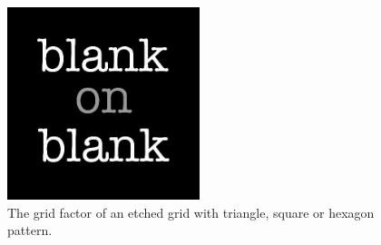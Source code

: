 \begin{figure}[h!]
  \centering
  \includegraphics[width=0.5\textwidth]
  {blank.jpg}
  \caption{The grid factor of an etched grid with triangle, square or hexagon pattern. }
  \label{fig: result etched grid}
\end{figure}

